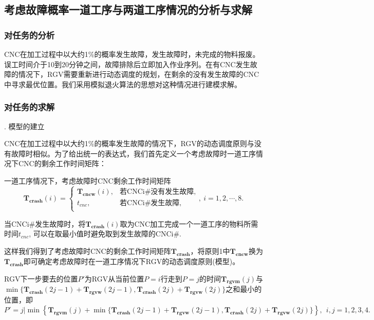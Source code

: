 \documentclass[no-math,withoutpreface,bwprint]{cumcmthesis} %
\numberwithin{equation}{section}
\numberwithin{figure}{section}
\numberwithin{table}{section}
\begin{document}
\subsection{考虑故障概率一道工序与两道工序情况的分析与求解}

\subsubsection{对任务的分析}

CNC在加工过程中以大约1\%的概率发生故障，发生故障时，未完成的物料报废。误工时间介于10到20分钟之间，故障排除后立即加入作业序列。在有CNC发生故障的情况下，RGV需要重新进行动态调度的规划，在剩余的没有发生故障的CNC中寻求最优位置。我们采用模拟退火算法的思想对这种情况进行建模求解。

\subsubsection{对任务的求解}


. 模型的建立

CNC在加工过程中以大约1\%的概率发生故障的情况下，RGV的动态调度原则与没有故障时相似。为了给出统一的表达式，我们首先定义一个考虑故障时一道工序情况下CNC的剩余工作时间矩阵：

\begin{definition}
一道工序情况下，考虑故障时CNC剩余工作时间矩阵
\begin{equation}
\mathbf{T_{crash}}(i)=\left\{\begin{array}{ll}
\mathbf{T_{cncw}}(i),&\text{若CNCi\#没有发生故障,}\\
t_{cnc},&\text{若CNCi\#发生故障,}\\
\end{array}\right.
,\ i=1,2,\cdots,8.
\end{equation}

当CNCi\#发生故障时，将$\mathbf{T_{crash}}(i)$取为CNC加工完成一个一道工序的物料所需时间$t_{cnc}$, 可以在取最小值时避免取到发生故障的CNCi\#.
\end{definition}

这样我们得到了考虑故障时CNC的剩余工作时间矩阵$\mathbf{T_{crash}}$，将原则1中$\mathbf{T_{cncw}}$换为$\mathbf{T_{crash}}$即可确定考虑故障时在一道工序情况下RGV的动态调度原则(模型)。

\begin{principle}
RGV下一步要去的位置$P'$为RGV从当前位置$P=i$行走到$P=j$的时间$\mathbf{T_{rgvm}}(j)$与$\min\{\mathbf{T_{crash}}(2j-1)+\mathbf{T_{rgvw}}(2j-1),\mathbf{T_{crash}}(2j)+\mathbf{T_{rgvw}}(2j)\}$之和最小的位置，即
\begin{equation}
P'=j\Big|\min\left\{\mathbf{T_{rgvm}}(j)+\min\{\mathbf{T_{crash}}(2j-1)+\mathbf{T_{rgvw}}(2j-1),\mathbf{T_{crash}}(2j)+\mathbf{T_{rgvw}}(2j)\}\right\},\ \ i, j=1,2,3,4.
\end{equation}

\end{principle}
\end{document}
